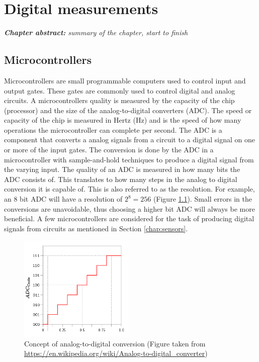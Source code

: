 \chapter{Digital measurements}
\label{chap:extracting}
\textit{\textbf{Chapter abstract:} summary of the chapter, start to finish}
\section{Microcontrollers}
\label{sec:microcontrollers}
Microcontrollers are small programmable computers used to control input and output gates. These gates are commonly used to control digital and analog circuits. A microcontrollers quality is measured by the capacity of the chip (processor) and the size of the analog-to-digital converters (ADC). The speed or capacity of the chip is measured in Hertz (Hz) and is the speed of how many operations the microcontroller can complete per second. The ADC is a component that converts a analog signals from a circuit to a digital signal on one or more of the input gates. The conversion is done by the ADC in a microcontroller with sample-and-hold techniques to produce a digital signal from the varying input. The quality of an ADC is measured in how many bits the ADC consists of. This translates to how many steps in the analog to digital conversion it is capable of. This is also referred to as the resolution. For example, an 8 bit ADC will have a resolution of $2^{8} = 256$ (Figure \ref{fig:adc}). Small errors in the conversions are unavoidable, thus choosing a higher bit ADC will always be more beneficial. A few microcontrollers are considered for the task of producing digital signals from circuits as mentioned in Section \ref{chap:sensors}.

\begin{figure}[!b]
    \centering
    \includegraphics[width=0.49\textwidth]{figures/ADC_voltage_resolution.png}
    \caption{Concept of analog-to-digital conversion (Figure taken from \url{https://en.wikipedia.org/wiki/Analog-to-digital_converter})}
    \label{fig:adc}
\end{figure}


